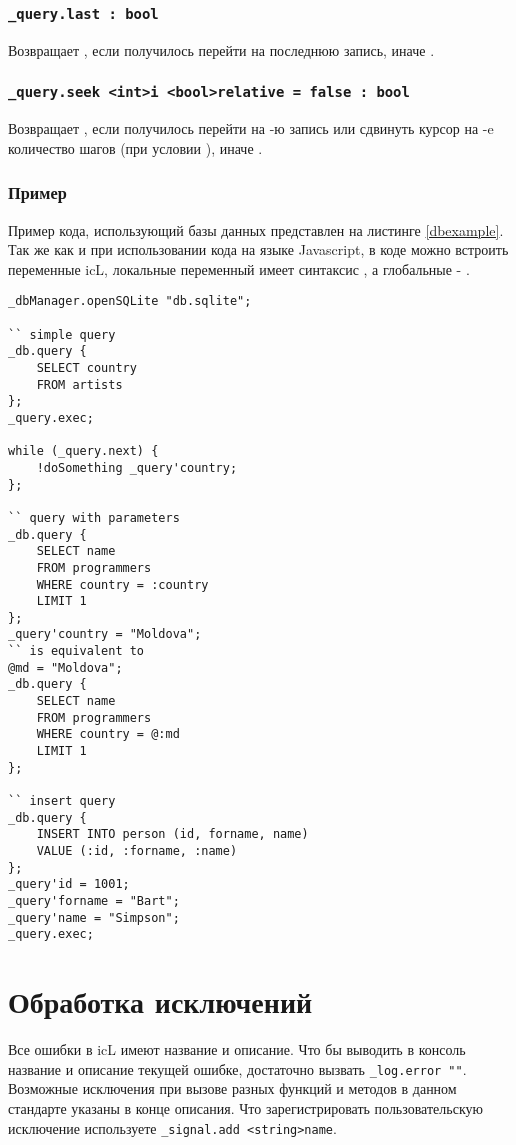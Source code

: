 \documentclass[a4paper, 14pt]{extarticle}
\begin{document}
\subsubsection{\lstinline|_query.last : bool|}

Возвращает \true, если получилось перейти на последнюю запись, иначе \false.

\subsubsection{\lstinline|_query.seek <int>i <bool>relative = false : bool|}

Возвращает \true, если получилось перейти на -ю запись или сдвинуть курсор на -e количество шагов (при условии ), иначе \false.

\subsubsection{Пример}

Пример кода, использующий базы данных представлен на листинге \ref{dbexample}. Так же как и при использовании кода на языке Javascript, в коде можно встроить переменные icL, локальные переменный имеет синтаксис , а глобальные - .

\begin{lstlisting}[caption=Пример кода использующий базу данных, label=dbexample]
_dbManager.openSQLite "db.sqlite";

`` simple query
_db.query {
	SELECT country
	FROM artists
};
_query.exec;

while (_query.next) {
	!doSomething _query'country;
};

`` query with parameters
_db.query {
	SELECT name
	FROM programmers
	WHERE country = :country
	LIMIT 1
};
_query'country = "Moldova";
`` is equivalent to
@md = "Moldova";
_db.query {
	SELECT name
	FROM programmers
	WHERE country = @:md
	LIMIT 1
};

`` insert query
_db.query {
	INSERT INTO person (id, forname, name)
	VALUE (:id, :forname, :name)
};
_query'id = 1001;
_query'forname = "Bart";
_query'name = "Simpson";
_query.exec;
\end{lstlisting}

\section{Обработка исключений}

Все ошибки в icL имеют название и описание. Что бы выводить в консоль название и описание текущей ошибке, достаточно вызвать \lstinline|_log.error ""|. Возможные исключения при вызове разных функций и методов в данном стандарте указаны в конце описания. Что зарегистрировать пользовательскую исключение используете \lstinline|_signal.add <string>name|.
\end{document}
